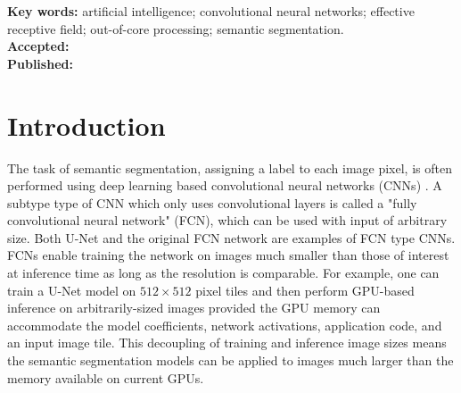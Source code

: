 \documentclass[10pt, indentfirst]{article}
\renewcommand{\headrulewidth}{.5pt}
\renewcommand{\footrulewidth}{0pt}
\begin{document}
\begin{flushleft}
	
	
	\vspace{8pt} 
	\textbf{Key words:} artificial intelligence; convolutional neural networks; effective receptive field; out-of-core processing; semantic segmentation. \\ %
	\vspace{8pt} 
	\textbf{Accepted:} \accepted \\
	\vspace{8pt} 
	\textbf{Published:} \published \\ %
	\vspace{8pt} 
	\DOI
\end{flushleft}
\vspace{-15pt}
\LARGE \hrulefill

\setlength{\abovedisplayskip}{19pt}
\setlength{\belowdisplayskip}{19pt}
\setlength{\abovedisplayshortskip}{9pt}
\setlength{\belowdisplayshortskip}{19pt}

\raggedright
\setlength\parindent{16pt}

\pagestyle{fancy}
\renewcommand{\headrulewidth}{.5pt}
  \renewcommand{\footrulewidth}{0pt}
  \fancyhead{}


\fancyfoot{} 
\fancyfoot[c]{\thepage}
\fancyfoot[r]{\DOI}



\section{Introduction}


\normalsize

The task of semantic segmentation, assigning a label to each image pixel, is often performed using deep learning based convolutional neural networks (CNNs) \citep{Badrinarayanan2015a,Ronneberger2015a}.
A subtype type of CNN which only uses convolutional layers is called a "fully convolutional neural network" (FCN), which can be used with input of arbitrary size.
Both U-Net \citep{Ronneberger2015a} and the original FCN network \citep{Long2015} are examples of FCN type CNNs.
FCNs enable training the network on images much smaller than those of interest at inference time as long as the resolution is comparable.
For example, one can train a U-Net model on $512 \times 512$ pixel tiles and then perform GPU-based inference on arbitrarily-sized images provided the GPU memory can accommodate the model coefficients, network activations, application code, and an input image tile.
This decoupling of training and inference image sizes means the semantic segmentation models can be applied to images much larger than the memory available on current GPUs.
\end{document}
